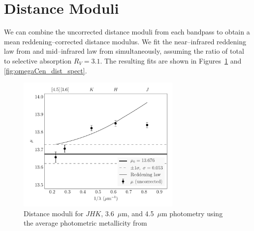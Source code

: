 \documentclass[a4paper,fleqn,usenatbib]{mnras}
\begin{document}
\section{Distance Moduli}
\label{sec:distance_moduli}

We can combine the uncorrected distance moduli from each bandpass to obtain a mean reddening--corrected distance modulus. We fit the near--infrared reddening law from \citet{1989ApJ...345..245C} and mid--infrared law from \citet{2005ApJ...619..931I} simultaneously, assuming the ratio of total to selective absorption $R_V = 3.1$. The resulting fits are shown in Figures~\ref{fig:omegaCen_dist_phot} and \ref{fig:omegaCen_dist_spect}.


\begin{figure}
\begin{center}
\includegraphics[width=80mm]{final_plots/multiwavelength_distance_samestars_phot.pdf}
\caption{Distance moduli for $J\!H\!K$, 3.6~$\mu$m, and 4.5~$\mu$m photometry using the average photometric metallicity from \citet{2000AJ....119.1824R}}
\label{fig:omegaCen_dist_phot}
\end{center}
\end{figure}
\end{document}
